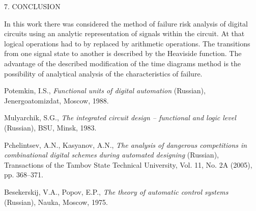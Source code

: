 \documentclass[12pt]{article}
\begin{document}
\begin{center}
   7. CONCLUSION
\end{center}

In this work there was considered the method of failure risk analysis of digital
circuits using an analytic representation of signals within the circuit. At that
logical operations had to by replaced by arithmetic operations. The transitions
from one signal state to another is described by the Heaviside function. The
advantage of the described modification of the time diagrams method is the
possibility of analytical analysis of the characteristics of failure.

\begin{thebibliography}{00}

 Potemkin, I.S., {\em Functional units of digital automation}
(Russian), Jenergoatomizdat, Moscow, 1988.

 Mulyarchik, S.G., {\em The integrated circuit design --
functional and logic level} (Russian), BSU, Minsk, 1983.

 Pchelintsev, A.N., Kasyanov, A.N., {\em The analysis of
dangerous competitions in combinational digital schemes during automated
designing} (Russian), Transactions of the Tambov State Technical University,
Vol. 11, No. 2A (2005), pp. 368--371.

 Besekerskij, V.A., Popov, E.P., {\em The theory of
automatic control systems} (Russian), Nauka, Moscow, 1975.

\end{thebibliography}
\end{document}
